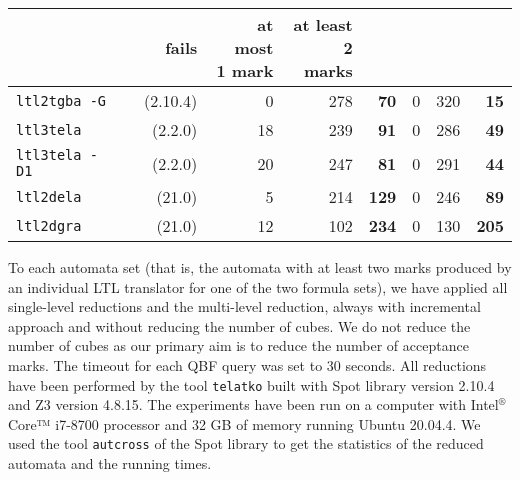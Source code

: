 \documentclass[a4paper,UKenglish,cleveref,autoref,thm-restate]{lipics-v2021}
\newcommand{\todo}[1]{\marginpar{\textcolor{red}{#1}}}
\begin{document}
\begin{table}[t]
\begin{tabular}{lrrrrrrr}
  & ~~~~fails & \makecell[r]{at most\\[-1ex] 1 mark} & \makecell[r]{\textbf{at least}\\[-1ex] \textbf{2 marks}}\\
  \midrule 
  \texttt{ltl2tgba -G} & (2.10.4)\tablefootnote{\url{https://spot.lrde.epita.fr}}
  & 0 & 278 & \textbf{70} & 0 & 320 & \textbf{15}\\
  \texttt{ltl3tela} & (2.2.0)\tablefootnote{\url{https://github.com/jurajmajor/ltl3tela}}
  & 18 & 239 & \textbf{91} & 0 & 286 & \textbf{49}\\
  \texttt{ltl3tela -D1} & (2.2.0)\footnotemark[2]
  & 20 & 247 & \textbf{81} & 0 & 291 & \textbf{44}\\ 
  \texttt{ltl2dela} & (21.0)\tablefootnote{\label{fn:owl}\url{https://owl.model.in.tum.de/}}
  & 5 & 214 & \textbf{129} & 0 & 246 & \textbf{89}\\
  \texttt{ltl2dgra} & (21.0)\footnotemark[3]
  & 12 & 102 & \textbf{234} & 0 & 130 & \textbf{205}\\
  \bottomrule
\end{tabular}
\end{table}

To each automata set (that is, the automata with at least two marks
produced by an individual LTL translator for one of the two formula
sets), we have applied all single-level reductions and the multi-level
reduction, always with incremental approach and without reducing the
number of cubes. We do not reduce the number of cubes as our primary
aim is to reduce the number of acceptance marks.
The timeout for each QBF query was set to 30 seconds.
%
All reductions have been performed by the tool \texttt{telatko}
built with Spot library version 2.10.4 and Z3 version 4.8.15. The
experiments have been run on a computer with Intel$^\text{®}$ Core™ i7-8700
processor and 32 GB of memory running Ubuntu 20.04.4. We used the tool
\texttt{autcross} of the Spot library to get the statistics of the
reduced automata and the running times.
\end{document}
